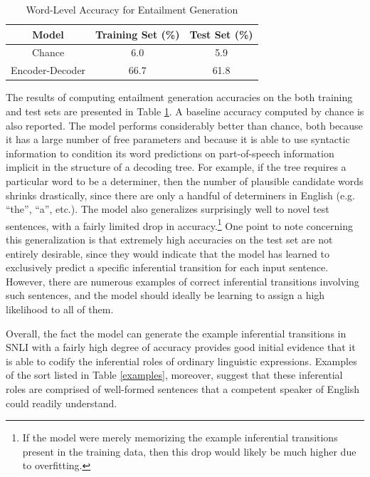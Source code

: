\begin{table}[!t]
\begin{center} 
\caption{Word-Level Accuracy for Entailment Generation} 
\label{accuracy} 
\vskip 0.12in
\begin{tabular}{c c c} 
\hline
Model  &  Training Set (\%)  & Test Set (\%)\\
\hline
\rule{0pt}{3ex}Chance  &  6.0 &  5.9 \\
Encoder-Decoder  &  66.7 & 61.8  \\
\hline
\end{tabular} 
\end{center} 
\end{table}

The results of computing entailment generation accuracies on the both training and test sets are presented in Table \ref{accuracy}. A baseline accuracy computed by chance is also reported. The model performs considerably better than chance, both because it has a large number of free parameters and because it is able to use syntactic information to condition its word predictions on part-of-speech information implicit in the structure of a decoding tree. For example, if the tree requires a particular word to be a determiner, then the number of plausible candidate words shrinks drastically, since there are only a handful of determiners in English (e.g. ``the'', ``a'', etc.). The model also generalizes surprisingly well to novel test sentences, with a fairly limited drop in accuracy.\footnote{If the model were merely memorizing the example inferential transitions present in the training data, then this drop would likely be much higher due to overfitting.} One point to note concerning this generalization is that extremely high accuracies on the test set are not entirely desirable, since they would indicate that the model has learned to exclusively predict a specific inferential transition for each input sentence. However, there are numerous examples of correct inferential transitions involving such sentences, and the model should ideally be learning to assign a high likelihood to all of them.  

Overall, the fact the model can generate the example inferential transitions in SNLI with a fairly high degree of accuracy provides good initial evidence that it is able to codify the inferential roles of ordinary linguistic expressions. Examples of the sort listed in Table \ref{examples}, moreover, suggest that these inferential roles are comprised of well-formed sentences that a competent speaker of English could readily understand. 

